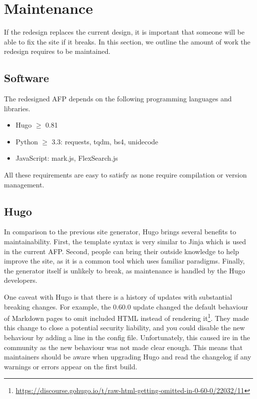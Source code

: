 \documentclass[bsc,frontabs,oneside,singlespacing,parskip,deptreport,logo]{infthesis}
\begin{document}
\section{Maintenance}

If the redesign replaces the current design, it is important that someone will be able to fix the site if it breaks. In this section, we outline the amount of work the redesign requires to be maintained.

\newpage

\subsection{Software}

The redesigned AFP depends on the following programming languages and libraries. 

\begin{itemize}
    \item Hugo $\geq$ 0.81
    \item Python $\geq$ 3.3: requests, tqdm, bs4, unidecode
    \item JavaScript: mark.js, FlexSearch.js
\end{itemize}

All these requirements are easy to satisfy as none require compilation or version management. 

\subsection{Hugo}

In comparison to the previous site generator, Hugo brings several benefits to maintainability. First, the template syntax is very similar to Jinja which is used in the current AFP\@. Second, people can bring their outside knowledge to help improve the site, as it is a common tool which uses familiar paradigms. Finally, the generator itself is unlikely to break, as maintenance is handled by the Hugo developers. 

One caveat with Hugo is that there is a history of updates with substantial breaking changes. For example, the 0.60.0 update changed the default behaviour of Markdown pages to omit included HTML instead of rendering it\footnote{\url{https://discourse.gohugo.io/t/raw-html-getting-omitted-in-0-60-0/22032/11}}. They made this change to close a potential security liability, and you could disable the new behaviour by adding a line in the config file. Unfortunately, this caused ire in the community as the new behaviour was not made clear enough. This means that maintainers should be aware when upgrading Hugo and read the changelog if any warnings or errors appear on the first build. 
\end{document}
